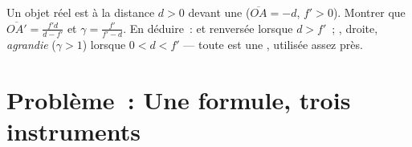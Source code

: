 \begin{exercise}[$\star\star\star$]\label{exo:g11:lenses-and-eye:15}
Un objet réel est à la distance $d > 0$ devant une
 ($\overline{OA} = -d$, $f' > 0$).
Montrer que $\overline{OA'} = \frac{f'd}{d - f'}$ et
$\gamma = \frac{f'}{f' - d}$. En déduire~:  et renversée lorsque $d > f'$~;
, droite, \emph{agrandie} ($\gamma > 1$)
lorsque $0 < d < f'$ --- toute  est
une , utilisée assez près.
\end{exercise}

\section{Problème~: Une formule, trois instruments}

